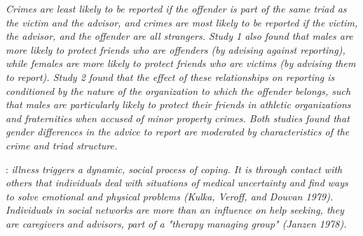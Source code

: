 \documentclass[]{article}
\begin{document}
	\cite{knoth2019reporting}
	\textit{Crimes are least likely to be reported if the offender is part of the same triad as the victim and the advisor, and crimes are most likely to be reported if the victim, the advisor, and the offender are all strangers. Study 1 also found that males are more likely to protect friends who are offenders (by advising against reporting), while females are more likely to protect friends who are victims (by advising them to report). Study 2 found that the effect of these relationships on reporting is conditioned by the nature of the organization to which the offender belongs, such that males are particularly likely to protect their friends in athletic organizations and fraternities when accused of minor property crimes. Both studies found that gender differences in the advice to report are moderated by characteristics of the crime and triad structure.
	}





	
	
	
	
	\cite{pescosolido1992beyond}:\textit{ illness triggers a dynamic, social process of coping. It is through contact with others that individuals deal with situations of medical uncertainty and find ways to solve emotional and physical problems (Kulka, Veroff, and Douvan 1979). Individuals in social networks are more than an influence on help seeking, they are caregivers and advisors, part of a "therapy managing group" (Janzen 1978).}
	
\end{document}
